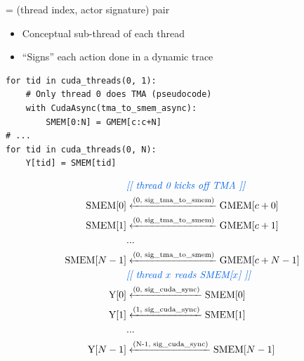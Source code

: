 \begin{minipage}[t]{0.48\textwidth}\fixminipage
{} = (thread index, actor signature) pair
\begin{itemize}
  \item Conceptual sub-thread of each thread
  \item ``Signs'' each action done in a dynamic trace
\end{itemize}
\vspace{2mm}
\begin{verbatim}
for tid in cuda_threads(0, 1):
    # Only thread 0 does TMA (pseudocode)
    with CudaAsync(tma_to_smem_async):
        SMEM[0:N] = GMEM[c:c+N]
# ...
for tid in cuda_threads(0, N):
    Y[tid] = SMEM[tid]
\end{verbatim}
\vspace{-4mm}
\begin{align*}
    & {\color{blueBoxFg}\textit{[[ thread 0 kicks off TMA ]]}} \\
    \text{SMEM[$0$]} & \xleftarrow{\text{(0, sig\_tma\_to\_smem)}} \text{GMEM[$c+0$]} \\
    \text{SMEM[$1$]} & \xleftarrow{\text{(0, sig\_tma\_to\_smem)}} \text{GMEM[$c+1$]} \\
    & ... \\
    \text{SMEM[$N-1$]} & \xleftarrow{\text{(0, sig\_tma\_to\_smem)}} \text{GMEM[$c+N-1$]} \\
    & {\color{blueBoxFg}\textit{[[ thread $x$ reads SMEM[$x$] ]]}} \\
    \text{Y[$0$]} & \xleftarrow{\text{(0, sig\_cuda\_sync)}} \text{SMEM[$0$]} \\
    \text{Y[$1$]} & \xleftarrow{\text{(1, sig\_cuda\_sync)}} \text{SMEM[$1$]} \\
    & ... \\
    \text{Y[$N-1$]} & \xleftarrow{\text{(N-1, sig\_cuda\_sync)}} \text{SMEM[$N-1$]} \\
\end{align*}
\end{minipage}
\newpage
